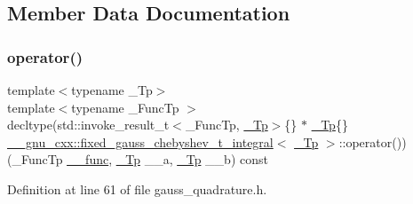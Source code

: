 \subsection{Member Data Documentation}
\mbox{\label{struct____gnu__cxx_1_1fixed__gauss__chebyshev__t__integral_a9f85a9c4a9cdafcc17d7691192ad3991}} 
\subsubsection{\texorpdfstring{operator()}{operator()}}
{\footnotesize\ttfamily template$<$typename \+\_\+\+Tp$>$ \\
template$<$typename \+\_\+\+Func\+Tp $>$ \\
decltype(std\+::invoke\+\_\+result\+\_\+t$<$\+\_\+\+Func\+Tp, \hyperlink{namespace____gnu__cxx_a3b19a9c800ca194374ef9172290f7d79}{\+\_\+\+Tp}$>$\{\} $\ast$ \hyperlink{namespace____gnu__cxx_a3b19a9c800ca194374ef9172290f7d79}{\+\_\+\+Tp}\{\} \hyperlink{struct____gnu__cxx_1_1fixed__gauss__chebyshev__t__integral}{\+\_\+\+\_\+gnu\+\_\+cxx\+::fixed\+\_\+gauss\+\_\+chebyshev\+\_\+t\+\_\+integral}$<$ \hyperlink{namespace____gnu__cxx_a3b19a9c800ca194374ef9172290f7d79}{\+\_\+\+Tp} $>$\+::operator()) (\+\_\+\+Func\+Tp \hyperlink{namespace____gnu__cxx_af2b2f0c7a2ae72b922b1afefae5a65b2}{\+\_\+\+\_\+func}, \hyperlink{namespace____gnu__cxx_a3b19a9c800ca194374ef9172290f7d79}{\+\_\+\+Tp} \+\_\+\+\_\+a, \hyperlink{namespace____gnu__cxx_a3b19a9c800ca194374ef9172290f7d79}{\+\_\+\+Tp} \+\_\+\+\_\+b) const}



Definition at line 61 of file gauss\+\_\+quadrature.\+h.

\mbox{\label{struct____gnu__cxx_1_1fixed__gauss__chebyshev__t__integral_a591563313b6205bd714cf1343cc48192}} 
